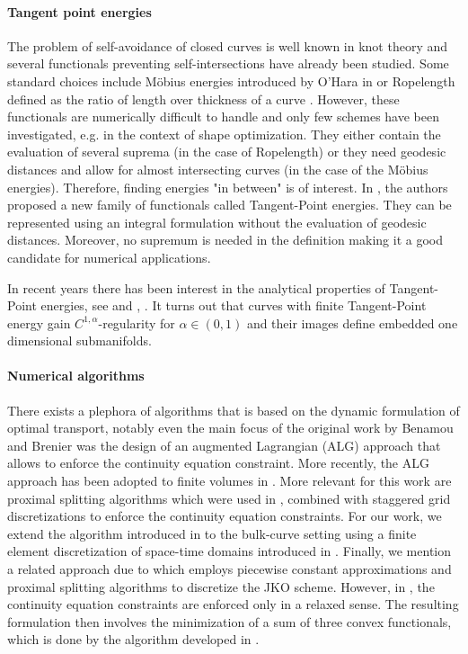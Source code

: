 \documentclass{article}
\begin{document}
\paragraph*{Tangent point energies}\label{DiscTPE}
The problem of self-avoidance of closed curves is well known in knot theory and several functionals preventing self-intersections have already been studied.
Some standard choices include Möbius energies introduced by O'Hara in \cite{ohara_family_1992} or Ropelength defined as the ratio of length over thickness of a curve \cite{gonzalez_global_1999}. 
However, these functionals are numerically difficult to handle and only few schemes have been investigated, e.g. \cite{walker_shape_2016} in the context of shape optimization. They either contain the evaluation of several suprema (in the case of Ropelength) or they need geodesic distances and allow for almost intersecting curves (in the case of the Möbius energies). 
Therefore, finding energies "in between" is of interest.
In \cite{gonzalez_global_1999}, the authors proposed a new family of functionals called Tangent-Point energies. They can be represented using an integral formulation without the evaluation of geodesic distances. Moreover, no supremum is needed in the definition making it a good candidate for numerical applications. 

In recent years there has been interest in the analytical properties of Tangent-Point energies, see \cite{STRZELECKI_2012} and \cite{Blatt2013}, \cite{blatt_regularity_2012}. It turns out that curves with finite Tangent-Point energy gain $C^{1,\alpha}$-regularity for $\alpha\in(0,1)$ and their images define embedded one dimensional submanifolds.

\paragraph*{Numerical algorithms}
There exists a plephora of algorithms that is based on the dynamic formulation of optimal transport, notably even the main focus of the original work by Benamou and Brenier \cite{benamou2000computational} was the design of an augmented Lagrangian (ALG) approach that allows to enforce the continuity equation constraint. More recently, the ALG approach has been adopted to finite volumes in \cite{Cances2020_FVSchemeJKO}.
%
More relevant for this work are proximal splitting algorithms which were used in \cite{Papadakis2014}, combined with staggered grid discretizations to enforce the continuity equation constraints.
%
For our work, we extend the algorithm introduced in \cite{benamou2000computational} to the bulk-curve setting using a finite element discretization of space-time domains introduced in \cite{fu_high_2023}. 
%
Finally, we mention a related approach due to \cite{Carrillo2022_PrimalDual} which employs piecewise constant approximations and proximal splitting algorithms to discretize the JKO scheme. However, in \cite{Carrillo2022_PrimalDual}, the continuity equation constraints are enforced only in a relaxed sense. The resulting formulation then involves the minimization of a sum of three convex functionals, which is done by the algorithm developed in \cite{Yan2018}.
\end{document}
